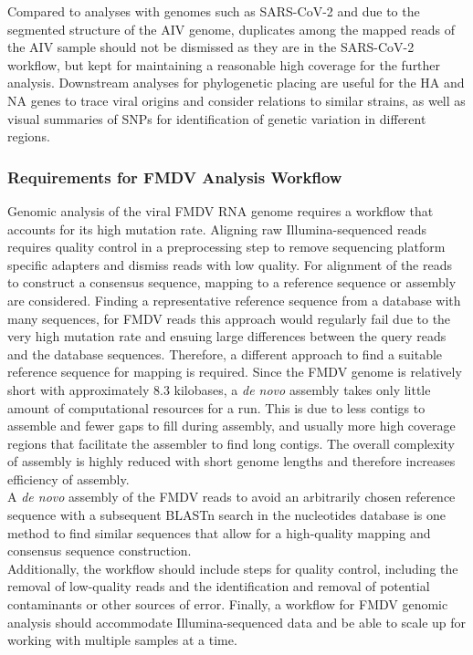 Compared to analyses with genomes such as \ac{SARS-CoV-2} and due to the segmented structure of the \ac{AIV} genome, duplicates among the mapped reads of the \ac{AIV} sample should not be dismissed as they are in the \ac{SARS-CoV-2} workflow, but kept for maintaining a reasonable high coverage for the further analysis. Downstream analyses for phylogenetic placing are useful for the \ac{HA} and \ac{NA} genes to trace viral origins and consider relations to similar strains, as well as visual summaries of \acp{SNP} for identification of genetic variation in different regions.

\subsubsection{Requirements for FMDV Analysis Workflow}
Genomic analysis of the viral \ac{FMDV} \ac{RNA} genome requires a workflow that accounts for its high mutation rate. Aligning raw Illumina-sequenced reads requires quality control in a preprocessing step to remove sequencing platform specific adapters and dismiss reads with low quality. For alignment of the reads to construct a consensus sequence, mapping to a reference sequence or assembly are considered. Finding a representative reference sequence from a database with many sequences, for \ac{FMDV} reads this approach would regularly fail due to the very high mutation rate and ensuing large differences between the query reads and the database sequences. Therefore, a different approach to find a suitable reference sequence for mapping is required. Since the \ac{FMDV} genome is relatively short with approximately 8.3 kilobases, a \textit{de novo} assembly takes only little amount of computational resources for a run. This is due to less contigs to assemble and fewer gaps to fill during assembly, and usually more high coverage regions that facilitate the assembler to find long contigs. The overall complexity of assembly is highly reduced with short genome lengths and therefore increases efficiency of assembly.\\
A \textit{de novo} assembly of the \ac{FMDV} reads to avoid an arbitrarily chosen reference sequence with a subsequent \ac{BLAST}n search in the nucleotides database is one method to find similar sequences that allow for a high-quality mapping and consensus sequence construction.\\
Additionally, the workflow should include steps for quality control, including the removal of low-quality reads and the identification and removal of potential contaminants or other sources of error. Finally, a workflow for \ac{FMDV} genomic analysis should accommodate Illumina-sequenced data and be able to scale up for working with multiple samples at a time.

